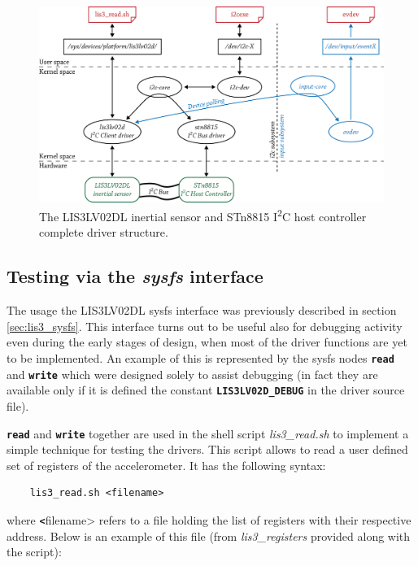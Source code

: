 \documentclass[a4paper,10pt]{article}
\newcommand{\iic}{I\textsuperscript{2}C }
\newcommand{\keyword}[1]{\texttt{\textbf{#1}}}
\begin{document}
\begin{multicols}{2}
\begin{figure}
 \centering
 \includegraphics[width=15cm]{./figures/nhk8815-whole-driver-system.png}
 \caption{The LIS3LV02DL inertial sensor and STn8815 \iic host controller
 	complete driver structure.}
 \label{fig:whole-driver-system}
\end{figure}


\subsection{Testing via the \emph{sysfs} interface}
\label{sec:sysfs-testing}
The usage the LIS3LV02DL sysfs interface was previously described in section
\ref{sec:lis3_sysfs}.
This interface turns out to be useful also for debugging activity even
during the early stages of design, when most of the driver functions are yet
to be implemented.
An example of this is represented by the sysfs nodes \keyword{read} and
\keyword{write} which were designed solely to assist debugging (in fact they
are available only if it is defined the constant \keyword{LIS3LV02D\_DEBUG}
in the driver source file). 

\keyword{read} and \keyword{write} together are used in the shell script
\emph{lis3\_read.sh} to implement a simple technique for testing the drivers.
This script allows to read a user defined set of registers of the accelerometer.
It has the following syntax:
\begin{verbatim}
	lis3_read.sh <filename>
\end{verbatim}
where \keyword <filename> refers to a file holding the list of registers with
their respective address. Below is an example of this file (from 
\emph{lis3\_registers} provided along with the script):


\end{multicols}
\end{document}
